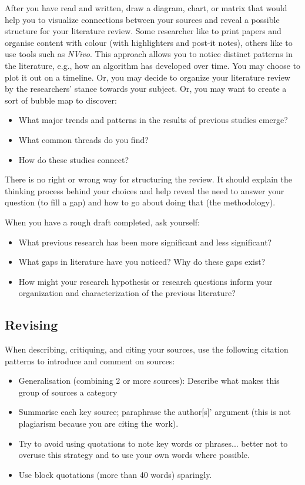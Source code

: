 After you have read and written, draw a diagram, chart, or matrix that would
help you to visualize connections between your sources and reveal a possible
structure for your literature review. Some researcher like to print papers and
organise content with colour (with highlighters and post-it notes), others like
to use tools such as \textit{NVivo}. This approach allows you to notice
distinct patterns in the literature, e.g., how an algorithm has developed over
time. You may choose to plot it out on a timeline. Or, you may decide to
organize your literature review by the researchers' stance towards your
subject. Or, you may want to create a sort of bubble map to discover:
\begin{itemize}
	\item What major trends and patterns in the results of previous studies emerge?
	\item What common threads do you find?
	\item How do these studies connect?
\end{itemize}
There is no right or wrong way for structuring the review. It should explain the thinking process behind your choices and help reveal the need to answer your question (to fill a gap) and how to
go about doing that (the methodology).

When you have a rough draft completed, ask yourself:
\begin{itemize}
	\item What previous research has been more significant and less significant?
	\item What gaps in literature have you noticed? Why do these gaps exist?
	\item How might your research hypothesis or research questions inform your
	      organization and characterization of the previous literature?
\end{itemize}

\subsection{Revising}
When describing, critiquing, and citing your sources, use the following
citation patterns to introduce and comment on sources:
\begin{itemize}
	\item Generalisation (combining 2 or more sources): Describe what makes this group of
	      sources a category
	\item Summarise each key source; paraphrase the author[s]' argument (this is not
	      plagiarism because you are citing the work).
	\item Try to avoid using quotations to note key words or phrases... better not to
	      overuse this strategy and to use your own words where possible.
	\item Use block quotations (more than 40 words) sparingly.
\end{itemize}

